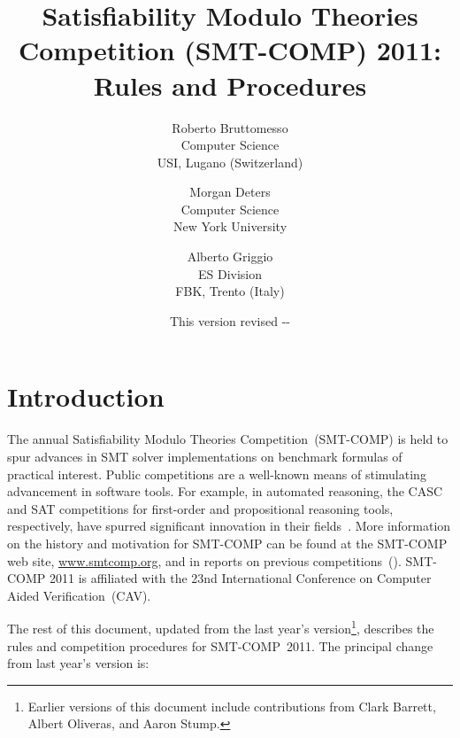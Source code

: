 \documentclass[12pt]{article}
\begin{document}
\date{\small This version revised \the\year-\the\month-\the\day}

\title{Satisfiability Modulo Theories Competition (SMT-COMP) 2011: Rules and 
Procedures
}

\def\doauthor#1{{%
  \hsize.5\hsize \advance\hsize by-1cm %
  \def\\{\hss\egroup\hbox to\hsize\bgroup\strut\hss}%
  \vbox{\hbox to\hsize\bgroup\strut\hss#1\hss\egroup}}}%

\def\header#1{\medskip\noindent\textbf{#1}}

\author{
Roberto Bruttomesso\\
Computer Science\\
USI, Lugano (Switzerland)
\and
Morgan Deters \\
Computer Science \\
New York University \\
\and
Alberto Griggio\\
ES Division\\
FBK, Trento (Italy)
}

\maketitle

\def\eg{\textit{e.g.}}
\def\ie{\textit{i.e.}}

\section{Introduction}
\label{sec:intro}

The annual Satisfiability Modulo Theories Competition~(SMT-COMP) is
held to spur advances in SMT solver implementations on benchmark
formulas of practical interest.  Public competitions are a well-known
means of stimulating advancement in software tools.  For example, in
automated reasoning, the CASC and SAT competitions for first-order and
propositional reasoning tools, respectively, have spurred significant
innovation in their fields~\cite{PSS02,leberre+03}.  More information
on the history and motivation for SMT-COMP can be found at the
SMT-COMP web site, \url{www.smtcomp.org}, and in reports on previous
competitions~(\cite{SMTCOMP-2008,BDOS08,SMTCOMP-FMSD,SMTCOMP-JAR}).
SMT-COMP 2011 is affiliated with the 23nd International
Conference on Computer Aided Verification~(CAV).

The rest of this document, updated from the last year's
version\footnote{Earlier versions of this document include contributions from
Clark Barrett, Albert Oliveras, and Aaron Stump.},
describes the rules and competition procedures for SMT-COMP~2011.
The principal change from last year's version is:
\end{document}
